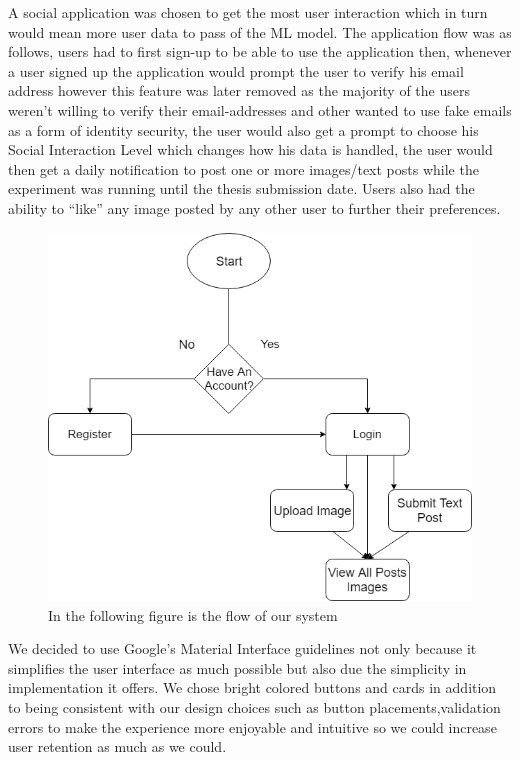 A social application was chosen to get the most user interaction which in turn would mean more user data to pass of the ML model.
The application flow was as follows, users had  to first sign-up to be able to use the application then, whenever a user signed up the application would prompt the user to verify his email address however this feature was later removed as the majority of the users weren't willing to verify their email-addresses and other wanted to use fake emails as a form of identity security, the user would also get a prompt to choose his Social Interaction Level which changes how his data is handled,
the user would then get a daily notification to post one or more images/text posts while the experiment was running until the thesis submission date.
Users also had the ability to “like” any image posted by any other user to further their preferences. 
\begin{figure}[H]
    \centering
    \includegraphics[scale=0.55]{FlowUpdate}
    \caption{In the following figure is the flow of our system}
    \label{fig:flow}
    \end{figure}
We decided to use Google's Material Interface guidelines not only because it simplifies the user interface as much possible but also due the simplicity in implementation it offers. We chose bright colored buttons and cards in addition to being consistent with our design choices such as button placements,validation errors to make the experience more enjoyable and intuitive so we could increase user retention as much as we could.
